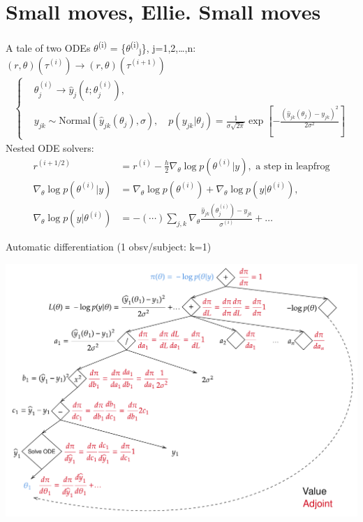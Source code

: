 \documentclass[bigger]{beamer}
\begin{document}
\section{Small moves, Ellie. Small moves}
\label{sec:org1ef9542}
\begin{frame}[label={sec:org85f78f8}]{A tale of two ODEs}
\(\theta\)\textsuperscript{(i)} = \{\(\theta\)\textsuperscript{(i)}\textsubscript{j}\}, j=1,2,\dots{},n: \((r, \theta)(\tau^{(i)}) \rightarrow (r, \theta)(\tau^{(i+1)})\)
\begin{align*}
\begin{cases}
  &\theta^{(i)}_j \rightarrow \hat{y}_j(t; \theta^{(i)}_j),\\
  &y_{jk} \sim \text{Normal}(\hat{y}_{jk}(\theta_j), \sigma),\quad p(y_{jk}|\theta_j) = \frac{1}{\sigma\sqrt{2\pi}}\exp{\left[-\frac{(\hat{y}_{jk}(\theta_j)-y_{jk})^2}{2\sigma^2}\right]}
\end{cases}
\end{align*}
Nested ODE solvers:
\begin{align*}
  r^{(i+1/2)} &= r^{(i)} - \frac{h}{2}\nabla_{\theta} \log{p(\theta^{(i)} | y)},\text{  a step in leapfrog}\\
  \nabla_{\theta} \log{p(\theta^{(i)} | y)} &= \nabla_{\theta} \log{p(\theta^{(i)})} + \nabla_{\theta} \log{p(y | \theta^{(i)})},\\
  \nabla_{\theta} \log{p(y | \theta^{(i)})} &= - (\cdots)\sum_{j,k}\nabla_{\theta} \frac{\hat{y}_{jk}(\theta_j^{(i)}) - y_{jk}}{\sigma^{(i)}} + \dots
\end{align*}
\end{frame}

\begin{frame}[label={sec:org56cce9b}]{Automatic differentiation (1 obsv/subject: k=1)}
\begin{center}
\includegraphics[width=\textwidth]{./figure/autodiff_diag.pdf}
\end{center}
\end{frame}
\end{document}
